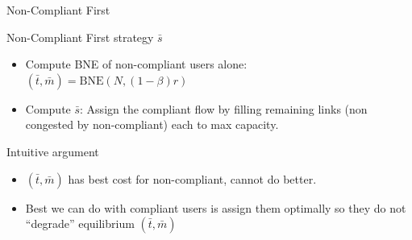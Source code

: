 \documentclass[xcolor=svgnames, english, smaller]{beamer}
\theoremstyle{plain}
\theoremstyle{definition}
\theoremstyle{plain}
\theoremstyle{plain}
\begin{document}

\begin{frame}{Non-Compliant First}

\begin{block}{Non-Compliant First strategy $\bar{s}$}
\begin{itemize}
\item Compute BNE of non-compliant users alone: $(\bar{t}, \bar{m}) = \text{BNE}(N, (1-\beta)r)$
\item \alert{Compute $\bar{s}$: Assign the compliant flow by filling remaining links (non congested by non-compliant) each to max capacity.}
\end{itemize}
\end{block}

Intuitive argument
\begin{itemize}
\item $(\bar{t}, \bar{m})$ has best cost for non-compliant, cannot do better.
\item Best we can do with compliant users is assign them optimally so they do not ``degrade'' equilibrium $(\bar{t}, \bar{m})$
\end{itemize}


\end{frame}
\end{document}
